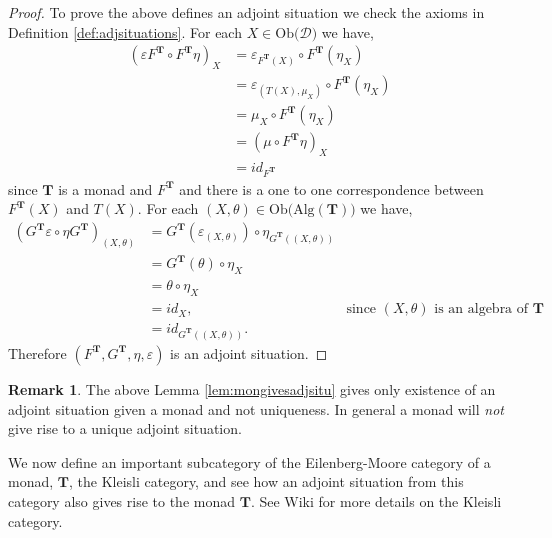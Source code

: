 \documentclass[11pt,a4paper]{article}
\theoremstyle{definition}
\newtheorem{remark}[thm]{Remark}
\newcommand\ob[1]{\mathrm{Ob(}#1\mathrm{)}}
\newcommand\cat[1]{\mathscr{#1}}
\newcommand{\alg}[1]{\mathrm{Alg}(\mathbf{#1})}
\numberwithin{equation}{section}
\begin{document}
\begin{proof}
    To prove the above defines an adjoint situation we check the axioms in Definition \ref{def:adjsituations}. For each $X\in\ob{\cat{D}}$ we have,
    \begin{align*}
        (\varepsilon F^{\mathbf{T}}\circ F^{\mathbf{T}}\eta)_X &= \varepsilon_{F^{\mathbf{T}}(X)} \circ F^{\mathbf{T}}(\eta_{X}) \\
        &= \varepsilon_{(T(X),\mu_{X})} \circ F^{\mathbf{T}}(\eta_{X}) \\
        &= \mu_{X} \circ F^{\mathbf{T}}(\eta_{X}) \\
        &= (\mu \circ F^{\mathbf{T}}\eta)_{X}\\
        &= id_{F^{\mathbf{T}}}
    \end{align*}
    since $\mathbf{T}$ is a monad and $F^{\mathbf{T}}$ and there is a one to one correspondence between $F^{\mathbf{T}}(X)$ and $T(X)$.
    For each $(X,\theta)\in\ob{\alg{T}}$ we have,
    \begin{align*}
        (G^{\mathbf{T}}\varepsilon \circ \eta G^{\mathbf{T}})_{(X,\theta)} &= G^{\mathbf{T}}(\varepsilon_{(X,\theta)}) \circ \eta_{G^{\mathbf{T}}((X,\theta))} \\
        &= G^{\mathbf{T}}(\theta) \circ \eta_{X} \\
        &=\theta \circ \eta_{X} \\
        &= id_{X}, & \text{since $(X,\theta)$ is an algebra of $\mathbf{T}$} \\
        &= id_{G^{\mathbf{T}}((X,\theta))}.
     \end{align*}
     Therefore $(F^{\mathbf{T}},G^{\mathbf{T}},\eta,\varepsilon)$ is an adjoint situation.
\end{proof}

\begin{remark}
    The above Lemma \ref{lem:mongivesadjsitu} gives only existence of an adjoint situation given a monad and not uniqueness. In general a monad will \emph{not} give rise to a unique adjoint situation.
\end{remark}

We now define an important subcategory of the Eilenberg-Moore category of a monad, $\mathbf{T}$, the Kleisli category, and see how an adjoint situation from this category also gives rise to the monad $\mathbf{T}$. See Wiki \cite{wiki:kleisli} for more details on the Kleisli category.
\end{document}
